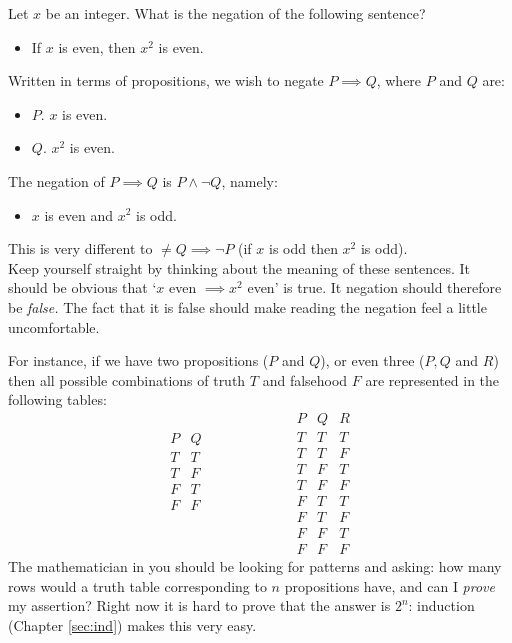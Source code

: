 \begin{example}{}{}
Let $x$ be an integer. What is the negation of the following sentence?
\begin{itemize}\setlength{\itemsep}{0pt}
  \item[] If $x$ is even, then $x^2$ is even.
\end{itemize}
Written in terms of propositions, we wish to negate $P\implies Q$, where $P$ and $Q$ are:
\begin{itemize}\setlength{\itemsep}{0pt}
  \item[]{$P.$} $x$ is even.
  \item[]{$Q.$} $x^2$ is even.
\end{itemize}
The negation of $P\implies Q$ is $P\wedge\neg Q$, namely:
\begin{itemize}\setlength{\itemsep}{0pt}
  \item[] $x$ is even and $x^2$ is odd.
\end{itemize}
This is very different to $\neq Q\implies\neg P$ (if $x$ is odd then $x^2$ is odd).\\[5pt]
Keep yourself straight by thinking about the meaning of these sentences. It should be obvious that `$x$ even $\implies x^2$ even' is true. It negation should therefore be \emph{false.} The fact that it is false should make reading the negation feel a little uncomfortable.
\end{example}




\goodbreak




  For instance, if we have two propositions ($P$ and $Q$), or even three ($P,Q$ and $R$) then all possible combinations of truth $T$ and falsehood $F$ are represented in the following tables:
\[\begin{array}{cc}
P & Q\\\hline
T & T\\
T & F\\
F & T\\
F & F\\
&\\&\\&\\&
\end{array}
\qquad\qquad\qquad
\begin{array}{ccc}
P & Q & R\\\hline
T & T & T\\
T & T & F\\
T & F & T\\
T & F & F\\
F & T & T\\
F & T & F\\
F & F & T\\
F & F & F
\end{array}\]
The mathematician in you should be looking for patterns and asking: how many rows would a truth table corresponding to $n$ propositions have, and can I \emph{prove} my assertion? Right now it is hard to prove that the answer is $2^n$: induction (Chapter \ref{sec:ind}) makes this very easy.







